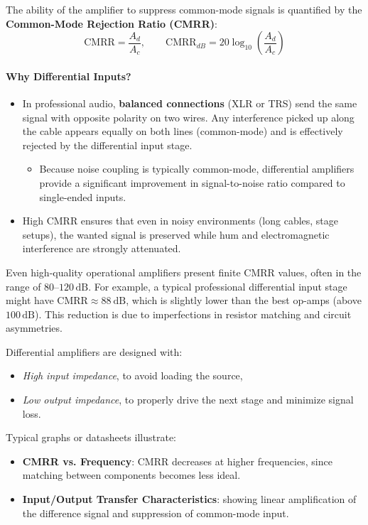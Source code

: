 \clearpage

The ability of the amplifier to suppress common-mode signals is quantified by the \textbf{Common-Mode Rejection Ratio (CMRR)}:
\[
\mathrm{CMRR} = \frac{A_d}{A_c}, 
\qquad 
\mathrm{CMRR}_{dB} = 20 \log_{10}\!\left(\frac{A_d}{A_c}\right)
\]
\paragraph{Why Differential Inputs?}
\begin{itemize}
  \item In professional audio, \textbf{balanced connections} (XLR or TRS) send the same signal with opposite polarity on two wires.  
  Any interference picked up along the cable appears equally on both lines (common-mode) and is effectively rejected by the differential input stage.
  \begin{itemize}
      \item Because noise coupling is typically common-mode, differential amplifiers provide a significant improvement in signal-to-noise ratio compared to single-ended inputs.
  \end{itemize}
  \item High CMRR ensures that even in noisy environments (long cables, stage setups), the wanted signal is preserved while hum and electromagnetic interference are strongly attenuated.
\end{itemize}

 
Even high-quality operational amplifiers present finite CMRR values, often in the range of $80$--$120\,\text{dB}$.  
For example, a typical professional differential input stage might have $\text{CMRR} \approx 88 \ \text{dB}$, which is slightly lower than the best op-amps (above $100\,\text{dB}$).  
This reduction is due to imperfections in resistor matching and circuit asymmetries.

Differential amplifiers are designed with:
\begin{itemize}
  \item \emph{High input impedance}, to avoid loading the source,
  \item \emph{Low output impedance}, to properly drive the next stage and minimize signal loss.
\end{itemize}

Typical graphs or datasheets illustrate:
\begin{itemize}
  \item \textbf{CMRR vs. Frequency}: CMRR decreases at higher frequencies, since matching between components becomes less ideal.
  \item \textbf{Input/Output Transfer Characteristics}: showing linear amplification of the difference signal and suppression of common-mode input.
\end{itemize}

